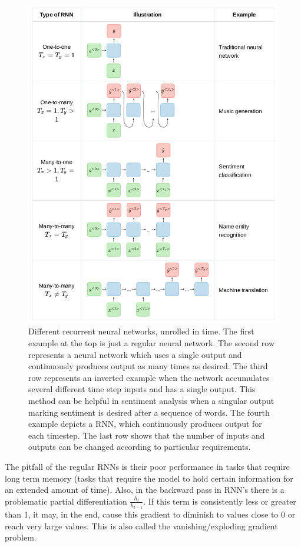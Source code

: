 \begin{figure}
  \centering
  \includegraphics[width=0.9\linewidth]{figures/chapter3/RCNN2.jpg}
  \caption[recu]{Different recurrent neural networks, unrolled in time. The first example at the top is just a regular neural network. The second row represents a neural network which uses a single output and continuously produces output as many times as desired. The third row represents an inverted example when the network accumulates several different time step inputs and has a single output. This method can be helpful in sentiment analysis when a singular output marking sentiment is desired after a sequence of words.
  The fourth example depicts a RNN, which continuously produces output for each timestep. The last row shows that the number of inputs and outputs can be changed according to particular requirements\footnotemark. }
  \label{fig:recurrent_div}


\end{figure}


The pitfall of the regular RNNs is their poor performance in tasks that require long term memory (tasks that require the model to hold certain information for an extended amount of time).
Also, in the backward pass in RNN's there is a problematic partial differentiation $\frac{h_{t}}{h_{t-1}}$. If this term is consistently less or greater than 1, it may, in the end, cause this gradient to diminish to values close to 0 or reach very large values. This is also called the vanishing/exploding gradient problem.

